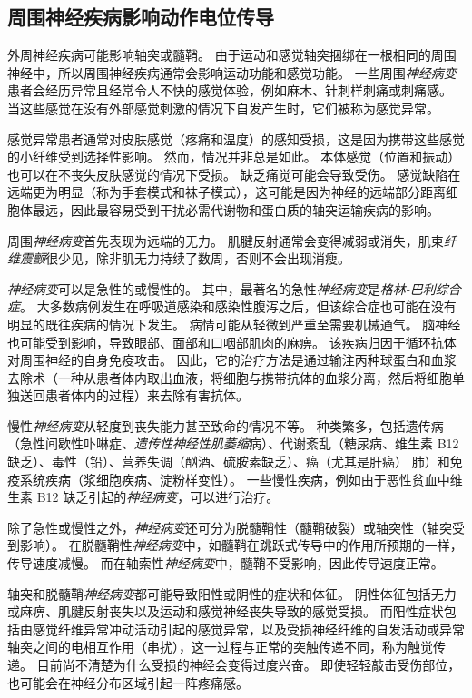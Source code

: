 \subsection{周围神经疾病影响动作电位传导}

外周神经疾病可能影响轴突或髓鞘。
由于运动和感觉轴突捆绑在一根相同的周围神经中，所以周围神经疾病通常会影响运动功能和感觉功能。
一些周围\textit{神经病变}患者会经历异常且经常令人不快的感觉体验，例如麻木、针刺样刺痛或刺痛感。
当这些感觉在没有外部感觉刺激的情况下自发产生时，它们被称为感觉异常。


感觉异常患者通常对皮肤感觉（疼痛和温度）的感知受损，这是因为携带这些感觉的小纤维受到选择性影响。 然而，情况并非总是如此。
本体感觉（位置和振动）也可以在不丧失皮肤感觉的情况下受损。
缺乏痛觉可能会导致受伤。
感觉缺陷在远端更为明显（称为手套模式和袜子模式），这可能是因为神经的远端部分距离细胞体最远，因此最容易受到干扰必需代谢物和蛋白质的轴突运输疾病的影响。


周围\textit{神经病变}首先表现为远端的无力。
肌腱反射通常会变得减弱或消失，肌束\textit{纤维震颤}很少见，除非肌无力持续了数周，否则不会出现消瘦。


\textit{神经病变}可以是急性的或慢性的。
其中，最著名的急性\textit{神经病变}是\textit{格林-巴利综合症}。
大多数病例发生在呼吸道感染和感染性腹泻之后，但该综合症也可能在没有明显的既往疾病的情况下发生。
病情可能从轻微到严重至需要机械通气。
脑神经也可能受到影响，导致眼部、面部和口咽部肌肉的麻痹。
该疾病归因于循环抗体对周围神经的自身免疫攻击。
因此，它的治疗方法是通过输注丙种球蛋白和血浆去除术（一种从患者体内取出血液，将细胞与携带抗体的血浆分离，然后将细胞单独送回患者体内的过程）来去除有害抗体。


慢性\textit{神经病变}从轻度到丧失能力甚至致命的情况不等。
种类繁多，包括遗传病（急性间歇性卟啉症、\textit{遗传性神经性肌萎缩}病）、代谢紊乱（糖尿病、维生素 B12 缺乏）、毒性（铅）、营养失调（酗酒、硫胺素缺乏）、癌（尤其是肝癌） 肺）和免疫系统疾病（浆细胞疾病、淀粉样变性）。
一些慢性疾病，例如由于恶性贫血中维生素 B12 缺乏引起的\textit{神经病变}，可以进行治疗。


除了急性或慢性之外，\textit{神经病变}还可分为脱髓鞘性（髓鞘破裂）或轴突性（轴突受到影响）。
在脱髓鞘性\textit{神经病变}中，如髓鞘在跳跃式传导中的作用所预期的一样，传导速度减慢。
而在轴索性\textit{神经病变}中，髓鞘不受影响，因此传导速度正常。


轴突和脱髓鞘\textit{神经病变}都可能导致阳性或阴性的症状和体征。
阴性体征包括无力或麻痹、肌腱反射丧失以及运动和感觉神经丧失导致的感觉受损。
而阳性症状包括由感觉纤维异常冲动活动引起的感觉异常，以及受损神经纤维的自发活动或异常轴突之间的电相互作用（串扰），这一过程与正常的突触传递不同，称为触觉传递。
目前尚不清楚为什么受损的神经会变得过度兴奋。
即使轻轻敲击受伤部位，也可能会在神经分布区域引起一阵疼痛感。


